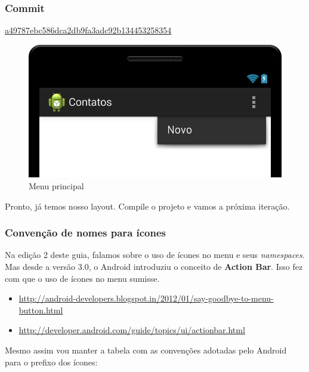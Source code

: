\begin{listing}[H]
  \inputminted[linenos=true,frame=bottomline,tabsize=3]{ xml }{ source/main_menu-1.xml }
  \caption{Menu principal [res/menu/main\b{ }menu.xml]}
\end{listing}

\subsubsection{Commit}

\href{https://github.com/atilacamurca/guia-aberto-android-contatos/commit/a49787ebc586dca2db9fa3adc92b134453258354}{a49787ebc586dca2db9fa3adc92b134453258354}

\begin{figure}[h]
    \includegraphics[scale=0.3]{img/exemplo-pratico/main_menu-1.png}
    \caption{Menu principal}
\end{figure}

Pronto, já temos nosso layout. Compile o projeto e vamos a próxima
iteração.

\subsubsection{Convenção de nomes para ícones \label{sssec:nomeicones}}

Na edição 2 deste guia, falamos sobre o uso de ícones no menu e seus
\emph{namespaces}. Mas desde a versão 3.0, o Android introduziu o
conceito de \textbf{Action Bar}. Isso fez com que o uso de ícones no
menu sumisse.

\begin{itemize}
\item
  \url{http://android-developers.blogspot.in/2012/01/say-goodbye-to-menu-button.html}
\item
  \url{http://developer.android.com/guide/topics/ui/actionbar.html}
\end{itemize}
Mesmo assim vou manter a tabela com as convenções adotadas pelo Android
para o prefixo dos ícones:

